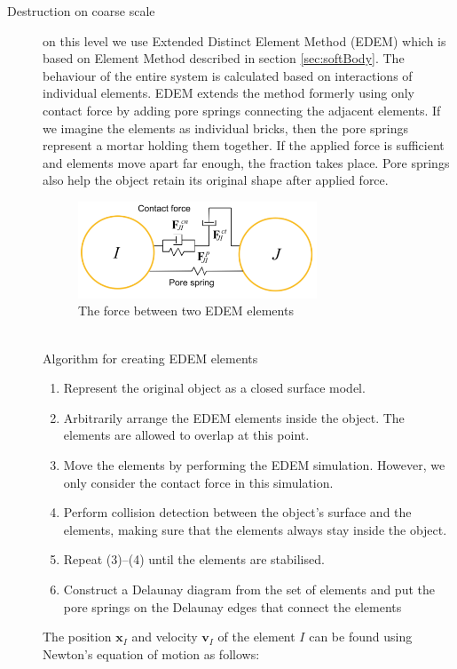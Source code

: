 \begin{description}
\item[Destruction on coarse scale] on this level we use Extended Distinct Element Method (EDEM) which is based on Element Method described in section \ref{sec:softBody}. The behaviour of the entire system is calculated based on interactions of individual elements. EDEM extends the method formerly using only contact force by adding pore springs connecting the adjacent elements. If we imagine the elements as individual bricks, then the pore springs represent a mortar holding them together. If the applied force is sufficient and elements move apart far enough, the fraction takes place. Pore springs also help the object retain its original shape after applied force.
\begin{figure}[ht!]
        \centering
        \includegraphics[width=0.7\textwidth]{img/spring}
        \caption{The force between two EDEM elements \cite{edem}}
        \label{spring}
\end{figure}
\\Algorithm for creating EDEM elements
\begin{enumerate}
\item Represent the original object as a closed surface model.
\item Arbitrarily arrange the EDEM elements inside the object.
The elements are allowed to overlap at this point.
\item Move the elements by performing the EDEM simulation. However, we only consider the contact force in this simulation.
\item Perform collision detection between the object’s surface
and the elements, making sure that the elements always
stay inside the object.
\item Repeat (3)–(4) until the elements are stabilised.
\item Construct a Delaunay diagram from the set of elements
and put the pore springs on the Delaunay edges that connect
the elements
\end{enumerate}
The position $\mathbf{x}_I$ and velocity $\mathbf{v}_I$ of the element $\mathit{I}$ can be found using Newton’s equation of motion as follows:
 

\end{description}
